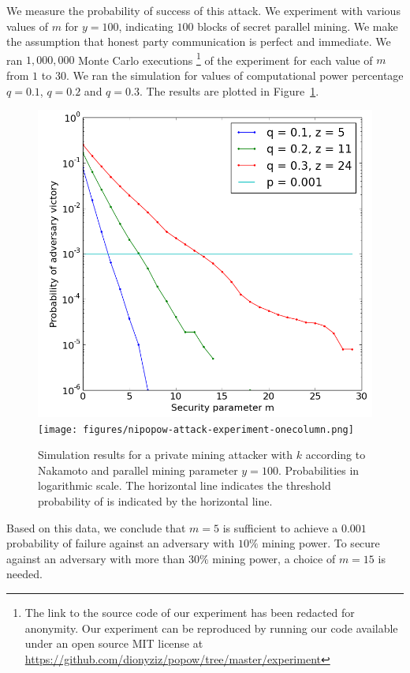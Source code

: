 We measure the probability of success of this attack. We experiment with various
values of $m$ for $y = 100$, indicating $100$ blocks of secret parallel mining.
We make the assumption that honest party communication is perfect and immediate.
We ran $1,000,000$ Monte Carlo executions
\footnote{
\ifanonymous
The link to the source code of our experiment has been redacted for anonymity.
\else
Our experiment can be reproduced by running our code available under
an open source MIT license at
\url{https://github.com/dionyziz/popow/tree/master/experiment}
\fi
}
of the experiment for each value
of $m$ from $1$ to $30$. We ran the simulation for values of computational power
percentage $q = 0.1$, $q = 0.2$ and $q = 0.3$. The results are plotted in
Figure~\ref{fig.nipopow-attack-experiment}.

\begin{figure}
    \caption{\label{fig.nipopow-attack-experiment}
        Simulation results for a private mining attacker with $k$ according to
        Nakamoto and parallel mining parameter $y = 100$. Probabilities in
        logarithmic scale. The horizontal line indicates the threshold
        probability of \cite{bitcoin} is indicated by the horizontal line.
    }
    \centering
    \iftwocolumn
        \includegraphics[width=0.8 \columnwidth,keepaspectratio]{figures/nipopow-attack-experiment.png}
    \else
        \texttt{[image: figures/nipopow-attack-experiment-onecolumn.png]}
    \fi
\end{figure}

Based on this data, we conclude that $m = 5$ is sufficient to achieve a $0.001$
probability of failure against an adversary with $10\%$ mining power. To secure
against an adversary with more than $30\%$ mining power, a choice of $m = 15$ is
needed.
